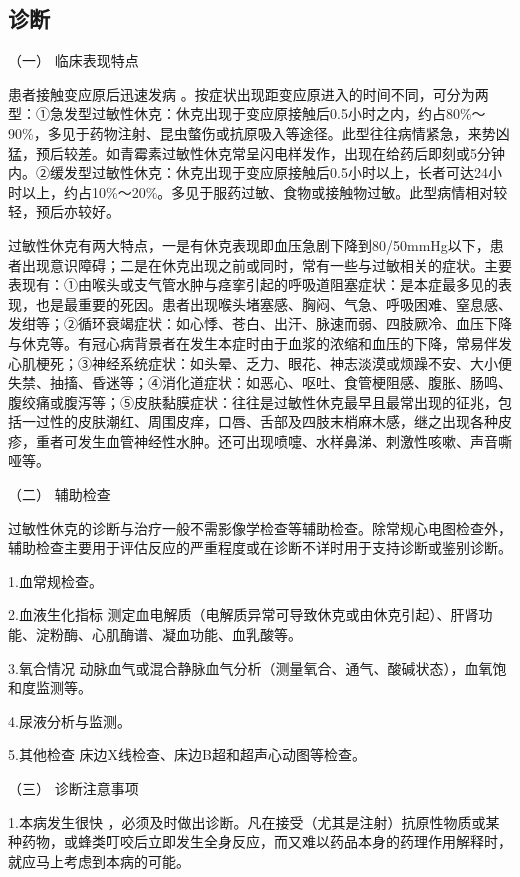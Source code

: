 \subsection{诊断}

\hypertarget{text00063.htmlux5cux23CHP2-5-2-1}{}
（一） 临床表现特点

患者接触变应原后迅速发病
。按症状出现距变应原进入的时间不同，可分为两型：①急发型过敏性休克：休克出现于变应原接触后0.5小时之内，约占80\%～90\%，多见于药物注射、昆虫螫伤或抗原吸入等途径。此型往往病情紧急，来势凶猛，预后较差。如青霉素过敏性休克常呈闪电样发作，出现在给药后即刻或5分钟内。②缓发型过敏性休克：休克出现于变应原接触后0.5小时以上，长者可达24小时以上，约占10\%～20\%。多见于服药过敏、食物或接触物过敏。此型病情相对较轻，预后亦较好。

过敏性休克有两大特点，一是有休克表现即血压急剧下降到80/50mmHg以下，患者出现意识障碍；二是在休克出现之前或同时，常有一些与过敏相关的症状。主要表现有：①由喉头或支气管水肿与痉挛引起的呼吸道阻塞症状：是本症最多见的表现，也是最重要的死因。患者出现喉头堵塞感、胸闷、气急、呼吸困难、窒息感、发绀等；②循环衰竭症状：如心悸、苍白、出汗、脉速而弱、四肢厥冷、血压下降与休克等。有冠心病背景者在发生本症时由于血浆的浓缩和血压的下降，常易伴发心肌梗死；③神经系统症状：如头晕、乏力、眼花、神志淡漠或烦躁不安、大小便失禁、抽搐、昏迷等；④消化道症状：如恶心、呕吐、食管梗阻感、腹胀、肠鸣、腹绞痛或腹泻等；⑤皮肤黏膜症状：往往是过敏性休克最早且最常出现的征兆，包括一过性的皮肤潮红、周围皮痒，口唇、舌部及四肢末梢麻木感，继之出现各种皮疹，重者可发生血管神经性水肿。还可出现喷嚏、水样鼻涕、刺激性咳嗽、声音嘶哑等。

\hypertarget{text00063.htmlux5cux23CHP2-5-2-2}{}
（二） 辅助检查

过敏性休克的诊断与治疗一般不需影像学检查等辅助检查。除常规心电图检查外，辅助检查主要用于评估反应的严重程度或在诊断不详时用于支持诊断或鉴别诊断。

1.血常规检查。

2.血液生化指标
测定血电解质（电解质异常可导致休克或由休克引起）、肝肾功能、淀粉酶、心肌酶谱、凝血功能、血乳酸等。

3.氧合情况
动脉血气或混合静脉血气分析（测量氧合、通气、酸碱状态），血氧饱和度监测等。

4.尿液分析与监测。

5.其他检查 床边X线检查、床边B超和超声心动图等检查。

\hypertarget{text00063.htmlux5cux23CHP2-5-2-3}{}
（三） 诊断注意事项

1.本病发生很快
，必须及时做出诊断。凡在接受（尤其是注射）抗原性物质或某种药物，或蜂类叮咬后立即发生全身反应，而又难以药品本身的药理作用解释时，就应马上考虑到本病的可能。

